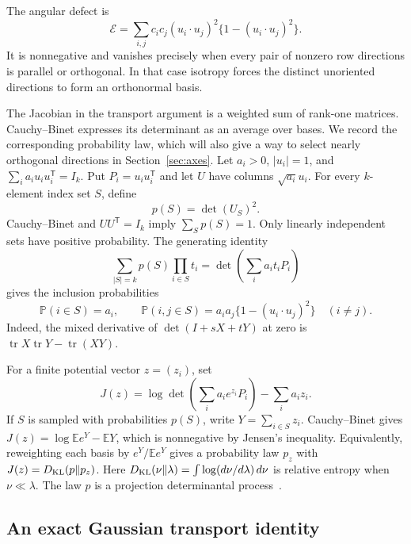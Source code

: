\documentclass[11pt,a4paper]{article}
\theoremstyle{remark}\newtheorem{remark}[theorem]{Remark}
\numberwithin{equation}{section}
\begin{document}
The angular defect is
\[
 \mathcal E=\sum_{i,j}c_i c_j(u_i\cdot u_j)^2
                          \{1-(u_i\cdot u_j)^2\}.
\]
It is nonnegative and vanishes precisely when every pair of nonzero
row directions is parallel or orthogonal. In that case isotropy forces
the distinct unoriented directions to form an orthonormal basis.

The Jacobian in the transport argument is a weighted sum of
rank-one matrices. Cauchy--Binet expresses its determinant as an
average over bases. We record the corresponding probability law,
which will also give a way to select nearly orthogonal directions
in Section~\ref{sec:axes}. Let $a_i>0$, $|u_i|=1$, and
$\sum_i a_i u_i u_i^{\mathsf T}=I_k$. Put $P_i=u_i u_i^{\mathsf T}$
and let $U$ have columns $\sqrt{a_i}u_i$. For every $k$-element index
set $S$, define
\[
 p(S)=\det(U_S)^2.
\]
Cauchy--Binet and $UU^{\mathsf T}=I_k$ imply $\sum_Sp(S)=1$.
Only linearly independent sets have positive probability. The generating
identity
\begin{equation}\label{eq:core-dpp-generating}
 \sum_{|S|=k}p(S)\prod_{i\in S}t_i
 =\det\left(\sum_i a_i t_iP_i\right)
\end{equation}
gives the inclusion probabilities
\begin{equation}\label{eq:core-dpp-inclusions}
 \mathbb P(i\in S)=a_i,
 \qquad
 \mathbb P(i,j\in S)=a_i a_j\{1-(u_i\cdot u_j)^2\}\quad(i\ne j).
\end{equation}
Indeed, the mixed derivative of $\det(I+sX+tY)$ at zero is
$\operatorname{tr}X\operatorname{tr}Y-\operatorname{tr}(XY)$.

For a finite potential vector $z=(z_i)$, set
\begin{equation}\label{eq:core-determinant-remainder}
 J(z)=\log\det\left(\sum_i a_i e^{z_i}P_i\right)-\sum_i a_i z_i.
\end{equation}
If \(S\) is sampled with probabilities \(p(S)\), write
\(Y=\sum_{i\in S}z_i\). Cauchy--Binet gives
\(J(z)=\log\mathbb E e^Y-\mathbb E Y\), which is nonnegative by Jensen's
inequality. Equivalently, reweighting each basis by \(e^Y/\mathbb E e^Y\)
gives a probability law \(p_z\) with \(J(z)=D_{\rm KL}(p\|p_z)\).
Here \(D_{\rm KL}(\nu\|\lambda)=\int\log(d\nu/d\lambda)\,d\nu\)
is relative entropy when \(\nu\ll\lambda\). The law \(p\) is a
projection determinantal process~\cite{Lyons2003}.

\subsection{An exact Gaussian transport identity}
\end{document}
